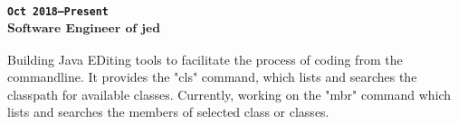 \subsubsection{
\textsubscript{
\uppercase{\texttt{Oct 2018--Present}}\\
Software Engineer of jed
}
}
Building Java EDiting tools to facilitate the process of coding from the commandline.
It provides the "cls" command, which lists and searches the classpath for available classes.
Currently, working on the "mbr" command which lists and searches the members of selected class or classes.
